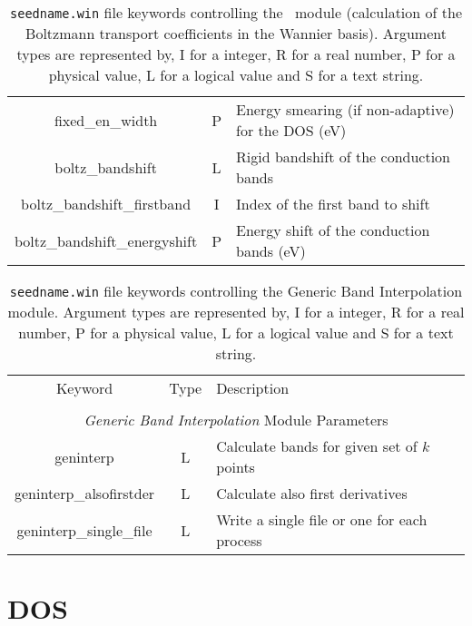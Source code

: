 \begin{table}[hH!]
\begin{center}
\begin{tabular}{|c|c|p{6cm}|}
{fixed\_en\_width} & P  & Energy smearing (if non-adaptive) for the DOS (eV) \\
{\sc boltz\_bandshift} & L & Rigid bandshift of the conduction bands\\
{\sc boltz\_bandshift\_firstband} & I & Index of the first band to shift\\
{\sc boltz\_bandshift\_energyshift} & P & Energy shift of the conduction bands (eV)\\
\hline
\end{tabular}
\caption[Parameter file keywords controlling the \bw\ module.]
{{\tt seedname.win} file keywords controlling the \bw\ module (calculation of the Boltzmann transport coefficients in the Wannier basis). Argument types
are represented by, I for a integer, R for a real number, P for a
physical value, L for a logical value and S for a text string.}
\label{parameter_keywords_bw}
\end{center}
\end{table}

\begin{table}[hH!]
\begin{center}
\begin{tabular}{|c|c|p{6cm}|}
\hline
Keyword & Type & Description \\
        &      &             \\
\hline\hline
\multicolumn{3}{|c|}{\emph{Generic Band Interpolation} Module Parameters} \\
\hline
{\sc geninterp}   & L & Calculate bands for given set of $k$ points \\
{\sc geninterp\_alsofirstder} & L & Calculate also first derivatives\\ 
{\sc geninterp\_single\_file} & L & Write a single file or one for each
process\\ 
\hline
\end{tabular}
\caption[Parameter file keywords controlling the Generic Band Interpolation module.]
{{\tt seedname.win} file keywords controlling the Generic Band Interpolation module. Argument types
are represented by, I for a integer, R for a real number, P for a
physical value, L for a logical value and S for a text string.}
\label{parameter_keywords_geninterp}
\end{center}
\end{table}

\clearpage
\section{DOS}
